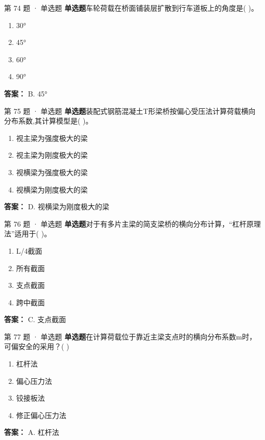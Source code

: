 \documentclass[UTF8,zihao=-4,openany]{ctexbook}
\newenvironment{choices}{\begin{enumerate}[label=\Alph*.,leftmargin=9mm,labelsep=3mm,itemsep=2pt,topsep=4pt]}{\end{enumerate}}
\newcommand{\qtype}[1]{\textcolor{brand}{\sffamily\bfseries #1}}
\begin{document}
\begin{questionbox}{第 74 题 · 单选题}
\qtype{单选题}\quad 车轮荷载在桥面铺装层扩散到行车道板上的角度是( )。
\begin{choices}
\item 30°
\item 45°
\item 60°
\item 90°
\end{choices}
\begin{answerbox}
\textbf{答案：} B. 45°
\end{answerbox}
\end{questionbox}

\begin{questionbox}{第 75 题 · 单选题}
\qtype{单选题}\quad 装配式钢筋混凝土T形梁桥按偏心受压法计算荷载横向分布系数,其计算模型是( )。
\begin{choices}
\item 视主梁为强度极大的梁
\item 视主梁为刚度极大的梁
\item 视横梁为强度极大的梁
\item 视横梁为刚度极大的梁
\end{choices}
\begin{answerbox}
\textbf{答案：} D. 视横梁为刚度极大的梁
\end{answerbox}
\end{questionbox}

\begin{questionbox}{第 76 题 · 单选题}
\qtype{单选题}\quad 对于有多片主梁的简支梁桥的横向分布计算，“杠杆原理法”适用于( )。
\begin{choices}
\item L/4截面
\item 所有截面
\item 支点截面
\item 跨中截面
\end{choices}
\begin{answerbox}
\textbf{答案：} C. 支点截面
\end{answerbox}
\end{questionbox}

\begin{questionbox}{第 77 题 · 单选题}
\qtype{单选题}\quad 在计算荷载位于靠近主梁支点时的横向分布系数m时，可偏安全的采用？( )
\begin{choices}
\item 杠杆法
\item 偏心压力法
\item 铰接板法
\item 修正偏心压力法
\end{choices}
\begin{answerbox}
\textbf{答案：} A. 杠杆法
\end{answerbox}
\end{questionbox}
\end{document}
